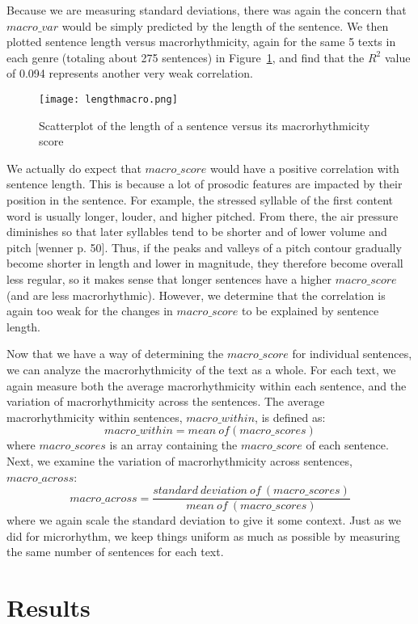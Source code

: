 \documentclass[pageno]{jpaper}
\begin{document}
Because we are measuring standard deviations, there was again the concern that $macro\_var$ would be simply predicted by the length of the sentence. We then plotted sentence length versus macrorhythmicity, again for the same 5 texts in each genre (totaling about 275 sentences) in Figure~\ref{fig:lengthmacro}, and find that the $R^{2}$ value of 0.094 represents another very weak correlation.

\begin{figure}[hbt]
\centering
\texttt{[image: lengthmacro.png]}
\caption{Scatterplot of the length of a sentence versus its macrorhythmicity score}
\label{fig:lengthmacro}
\end{figure}

We actually do expect that $macro\_score$ would have a positive correlation with sentence length. This is because a lot of prosodic features are impacted by their position in the sentence. For example, the stressed syllable of the first content word is usually longer, louder, and higher pitched. From there, the air pressure diminishes so that later syllables tend to be shorter and of lower volume and pitch [wenner p. 50]. Thus, if the peaks and valleys of a pitch contour gradually become shorter in length and lower in magnitude, they therefore become overall less regular, so it makes sense that longer sentences have a higher $macro\_score$ (and are less macrorhythmic). However, we determine that the correlation is again too weak for the changes in $macro\_score$ to be explained by sentence length. 

Now that we have a way of determining the $macro\_score$ for individual sentences, we can analyze the macrorhythmicity of the text as a whole. For each text, we again measure both the average macrorhythmicity within each sentence, and the variation of macrorhythmicity across the sentences. The average macrorhythmicity within sentences, $macro\_within$, is defined as:
\[
macro\_within = mean \ of (macro\_scores)
\]
where $macro\_scores$ is an array containing the $macro\_score$ of each sentence. Next, we examine the variation of macrorhythmicity across sentences, $macro\_across$:
\[
macro\_across = \frac{standard \ deviation \ of \ (macro\_scores)}{mean \ of \ (macro\_scores)}
\]
where we again scale the standard deviation to give it some context. Just as we did for microrhythm, we keep things uniform as much as possible by measuring the same number of sentences for each text.




\section{Results}
\end{document}
